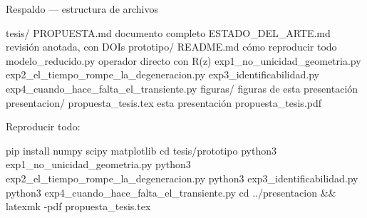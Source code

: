 \documentclass[aspectratio=169,10pt,t]{beamer}
\begin{document}
\begin{frame}[fragile]{Respaldo — estructura de archivos}
\scriptsize
\begin{semiverbatim}
tesis/
  PROPUESTA.md                           \textmd{documento completo}
  ESTADO\_DEL\_ARTE.md                     \textmd{revisión anotada, con DOIs}
  prototipo/
    README.md                            \textmd{cómo reproducir todo}
    modelo\_reducido.py                   \textmd{operador directo con R(z)}
    exp1\_no\_unicidad\_geometria.py
    exp2\_el\_tiempo\_rompe\_la\_degeneracion.py
    exp3\_identificabilidad.py
    exp4\_cuando\_hace\_falta\_el\_transiente.py
    figuras/                             \textmd{figuras de esta presentación}
  presentacion/
    propuesta\_tesis.tex                  \textmd{esta presentación}
    propuesta\_tesis.pdf
\end{semiverbatim}

\vspace{0.8em}
\small
Reproducir todo:
\scriptsize
\begin{semiverbatim}
pip install numpy scipy matplotlib
cd tesis/prototipo
python3 exp1\_no\_unicidad\_geometria.py
python3 exp2\_el\_tiempo\_rompe\_la\_degeneracion.py
python3 exp3\_identificabilidad.py
python3 exp4\_cuando\_hace\_falta\_el\_transiente.py
cd ../presentacion && latexmk -pdf propuesta\_tesis.tex
\end{semiverbatim}
\end{frame}
\end{document}

